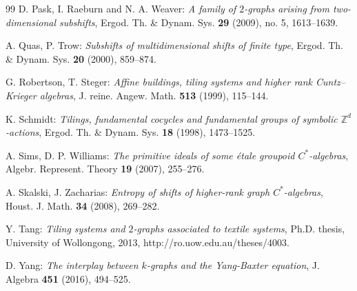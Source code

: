 \documentclass[a4paper,reqno,12pt]{amsart}
\theoremstyle{definition}
\theoremstyle{remark}
\begin{document}
\begin{thebibliography}{99}
D. Pask, I. Raeburn and N. A. Weaver: \emph{A family of $2$-graphs arising from two-dimensional subshifts}, Ergod. Th. \& Dynam. Sys. \textbf{29} (2009), no. 5, 1613--1639.

A. Quas, P. Trow: \emph{Subshifts of multidimensional shifts of finite type}, Ergod. Th. \& Dynam. Sys. \textbf{20} (2000), 859--874. 

G. Robertson, T. Steger: \emph{Affine buildings, tiling systems and higher rank Cuntz--Krieger algebras}, J. reine. Angew. Math. \textbf{513} (1999), 115--144.

K. Schmidt: \emph{Tilings, fundamental cocycles and fundamental groups of symbolic $\mathbb{Z}^d$-actions}, Ergod. Th. \& Dynam. Sys. \textbf{18} (1998), 1473--1525.

A. Sims, D. P. Williams: \emph{The primitive ideals of some \'{e}tale groupoid $C^*$-algebras}, Algebr. Represent. Theory \textbf{19} (2007), 255--276.

A. Skalski, J. Zacharias: \emph{Entropy of shifts of higher-rank graph $C^*$-algebras}, Houst. J. Math. \textbf{34} (2008), 269--282.

Y. Tang: \emph{Tiling systems and $2$-graphs associated to textile systems}, Ph.D. thesis, University of Wollongong, 2013, http://ro.uow.edu.au/theses/4003.

D. Yang: \emph{The interplay between $k$-graphs and the Yang-Baxter equation}, J. Algebra \textbf{451} (2016), 494--525.

\end{thebibliography}
\end{document}
